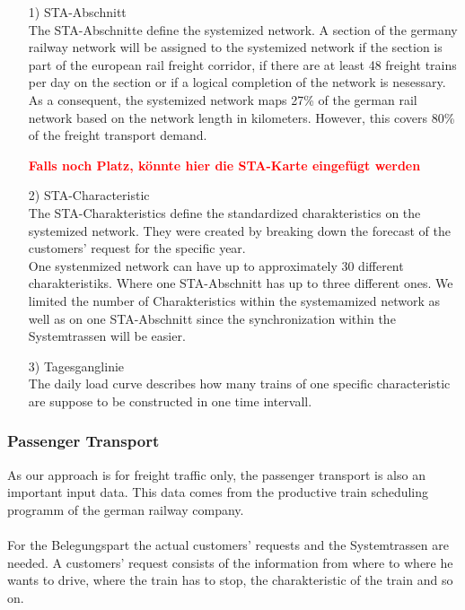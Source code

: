 \begin{itemize}
	\item[1)] STA-Abschnitt \\
	The STA-Abschnitte define the systemized network. A section of the germany railway network will be assigned to the systemized network if the section is part of the european rail freight corridor, if there are at least 48 freight trains per day on the section or if a logical completion of the network is nesessary. \\
	As a consequent, the systemized network maps 27\% of the german rail network based on the network length in kilometers. However, this covers 80\% of the freight transport demand. 
	
	\textbf{\textcolor{red}{Falls noch Platz, könnte hier die STA-Karte eingefügt werden}}
	
	\item[2)] STA-Characteristic \\
	The STA-Charakteristics define the standardized charakteristics on the systemized network. They were created by breaking down the forecast of the customers' request for the specific year. \\
	One systenmized network can have up to approximately 30 different charakteristiks. Where one STA-Abschnitt has up to three different ones. We limited the number of Charakteristics within the systemamized network as well as on one STA-Abschnitt since the synchronization within the Systemtrassen will be easier. 
	
	\item[3)] Tagesganglinie \\
	The daily load curve describes how many trains of one specific characteristic are suppose to be constructed in one time intervall. 
\end{itemize}

\subsubsection{Passenger Transport}
As our approach is for freight traffic only, the passenger transport is also an important input data. This data comes from the productive train scheduling programm of the german railway company. \\ 
\\
For the Belegungspart the actual customers' requests and the Systemtrassen are needed. A customers' request consists of the information from where to where he wants to drive, where the train has to stop, the charakteristic of the train and so on.\\



